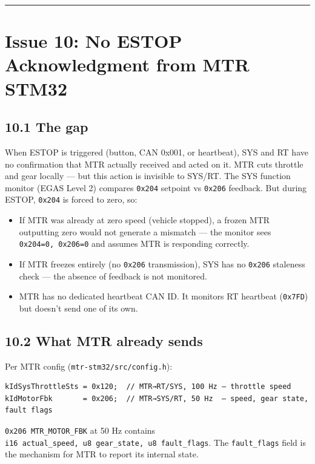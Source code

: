 \documentclass[12pt,a4paper,oneside]{report}
\providecommand{\tightlist}{\setlength{\itemsep}{0pt}\setlength{\parskip}{0pt}}
\begin{document}
\begin{center}\rule{0.5\linewidth}{0.5pt}\end{center}

\section{Issue 10: No ESTOP Acknowledgment from MTR
STM32}\label{issue-10-no-estop-acknowledgment-from-mtr-stm32}

\subsection{10.1 The gap}\label{the-gap-3}

When ESTOP is triggered (button, CAN 0x001, or heartbeat), SYS and RT have no
confirmation that MTR actually received and acted on it. MTR cuts throttle and
gear locally --- but this action is invisible to SYS/RT. The SYS function
monitor (EGAS Level 2) compares \texttt{0x204} setpoint vs \texttt{0x206}
feedback. But during ESTOP, \texttt{0x204} is forced to zero, so:

\begin{itemize}
\tightlist
\item
  If MTR was already at zero speed (vehicle stopped), a frozen MTR outputting
  zero would not generate a mismatch --- the monitor sees
  \texttt{0x204=0,\ 0x206=0} and assumes MTR is responding correctly.
\item
  If MTR freezes entirely (no \texttt{0x206} transmission), SYS has no
  \texttt{0x206} staleness check --- the absence of feedback is not monitored.
\item
  MTR has no dedicated heartbeat CAN ID. It monitors RT heartbeat
  (\texttt{0x7FD}) but doesn't send one of its own.
\end{itemize}

\subsection{10.2 What MTR already sends}\label{what-mtr-already-sends}

Per MTR config (\texttt{mtr-stm32/src/config.h}):

\begin{verbatim}
kIdSysThrottleSts = 0x120;  // MTR→RT/SYS, 100 Hz — throttle speed
kIdMotorFbk       = 0x206;  // MTR→SYS/RT, 50 Hz  — speed, gear state, fault flags
\end{verbatim}

\texttt{0x206\ MTR\_MOTOR\_FBK} at 50 Hz contains
\texttt{i16\ actual\_speed,\ u8\ gear\_state,\ u8\ fault\_flags}. The
\texttt{fault\_flags} field is the mechanism for MTR to report its internal
state.
\end{document}
